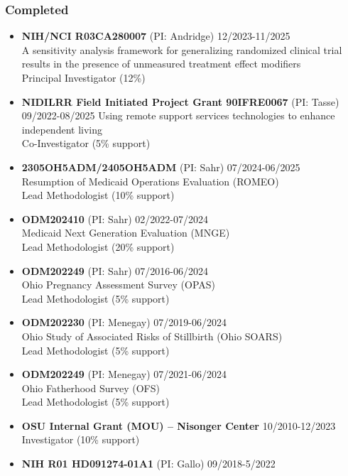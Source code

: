 \documentclass[
  english,
  letterpaper,
  DIV=11,
  numbers=noendperiod]{scrartcl}
\providecommand{\tightlist}{%
  \setlength{\itemsep}{0pt}\setlength{\parskip}{0pt}}
\begin{document}
\subsubsection{Completed}\label{completed}

\begin{itemize}
\tightlist
\item
  \textbf{NIH/NCI R03CA280007} (PI: Andridge) {12/2023-11/2025}\\
  A sensitivity analysis framework for generalizing randomized clinical
  trial results in the presence of unmeasured treatment effect
  modifiers\\
  Principal Investigator (12\%)
\item
  \textbf{NIDILRR Field Initiated Project Grant 90IFRE0067} (PI: Tasse)
  {09/2022-08/2025} Using remote support services technologies to
  enhance independent living\\
  Co-Investigator (5\% support)
\item
  \textbf{2305OH5ADM/2405OH5ADM} (PI: Sahr) {07/2024-06/2025}\\
  Resumption of Medicaid Operations Evaluation (ROMEO)\\
  Lead Methodologist (10\% support)
\item
  \textbf{ODM202410} (PI: Sahr) {02/2022-07/2024}\\
  Medicaid Next Generation Evaluation (MNGE)\\
  Lead Methodologist (20\% support)
\item
  \textbf{ODM202249} (PI: Sahr) {07/2016-06/2024}\\
  Ohio Pregnancy Assessment Survey (OPAS)\\
  Lead Methodologist (5\% support)
\item
  \textbf{ODM202230} (PI: Menegay) {07/2019-06/2024}\\
  Ohio Study of Associated Risks of Stillbirth (Ohio SOARS)\\
  Lead Methodologist (5\% support)
\item
  \textbf{ODM202249} (PI: Menegay) {07/2021-06/2024}\\
  Ohio Fatherhood Survey (OFS)\\
  Lead Methodologist (5\% support)
\item
  \textbf{OSU Internal Grant (MOU) -- Nisonger Center}
  {10/2010-12/2023}\\
  Investigator (10\% support)
\item
  \textbf{NIH R01 HD091274-01A1} (PI: Gallo) {09/2018-5/2022}\\

\end{itemize}
\end{document}
